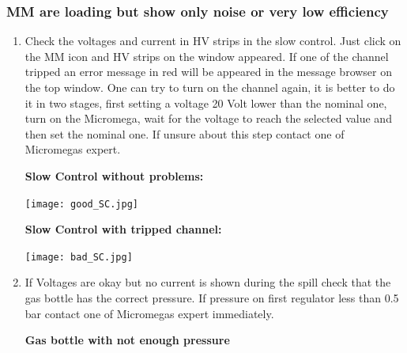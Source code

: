 \documentclass[a4paper]{article}
\begin{document}
\subsubsection{MM are loading but show only noise or very low efficiency}
\label{sec:org944e3d4}
\begin{enumerate}
\item Check the voltages and current in HV strips in the slow control. 
Just click on the MM icon and HV strips on the window appeared. If one of the channel tripped an error message in red will be appeared in the message browser on the top window. One can try to
turn on the channel again, it is better to do it in two stages, first setting a voltage 20 Volt lower than the nominal one, turn on the Micromega, wait for the voltage to reach the selected value and then
set the nominal one. If unsure about this step contact one of Micromegas expert.

\textbf{Slow Control without problems:}

\begin{center}
\texttt{[image: good\_SC.jpg]}
\end{center}

\textbf{Slow Control with tripped channel:}

\begin{center}
\texttt{[image: bad\_SC.jpg]}
\end{center}

\item If Voltages are okay but no current is shown during the spill check that the gas bottle has the correct pressure. If pressure on first regulator less than 0.5 bar contact one of Micromegas expert
immediately.

\textbf{Gas bottle with not enough pressure}


\end{enumerate}
\end{document}

